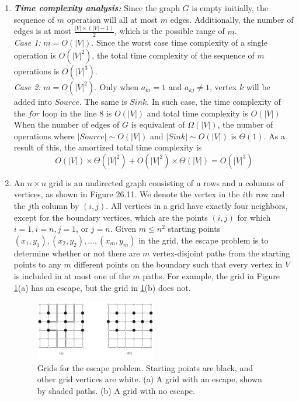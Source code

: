 \documentclass[12pt,a4paper]{article}
\makeatletter
\newtheorem*{solution}{Solution}
\theoremstyle{definition}
\renewenvironment{solution}[1][Solution] {\par\pushQED{\qed}\normalfont\topsep6\p@\@plus6\p@\relax\trivlist\item[\hskip\labelsep\bfseries#1\@addpunct{.}]\ignorespaces}{\popQED\endtrivlist\@endpefalse} \makeatother
\makeatother
\begin{document}
\begin{enumerate}
\begin{solution}
    \textbf{\textit{Time complexity analysis:}}
	Since the graph $G$ is empty initially, the sequence of $m$ operation will all at most $m$ edges. Additionally, the number of edges is at most $\frac{|V|\times (|V|-1)}{2}$, which is the possible range of $m$.
	\\
	\textit{Case 1:} $m=O(|V|)$. Since the worst case time complexity of a single operation is $O(|V|^2)$, the total time complexity of the sequence of $m$ operations is $O(|V|^3)$.\\
	\textit{Case 2:} $m=O(|V|^2)$. Only when $a_{ki}=1$ and $a_{kj}\neq 1$, vertex $k$ will be added into $Source$. The same is $Sink$. In such case, the time complexity of the $for$ loop in the line 8 is $O(|V|)$ and total time complexity is $O(|V|)$ \\
	When the number of edges of $G$ is equivalent of $\Omega(|V|)$, the number of operations where $|Source|\sim O(|V|)$ and $|Sink|\sim O(|V|)$ is $\Theta(1)$. 
	As a result of this, the amortized total time complexity is
	$$O(|V|)\times \Theta(|V|^2)+O(|V|^2)\times \Theta(|V|)=O(|V|^3)$$
	\end{solution}
	\item An $n\times n$ grid is an undirected graph consisting of n rows and n columns of vertices, as shown in Figure 26.11. We denote the vertex in the $i$th row and the $j$th column by $(i,j)$. All vertices in a grid have exactly four neighbors, except for the boundary vertices, which are the points $(i,j)$ for which $i = 1, i = n, j = 1$, or $j = n$.
    Given $m\leqslant n^2$ starting points $(x_1,y_1), (x_2, y_2), ... , (x_m, y_m)$ in the grid, the escape problem is to determine whether or not there are $m$ vertex-disjoint paths from the starting points to any $m$ different points on the boundary such that every vertex in $V$ is included in at most one of the $m$ paths. For example, the grid in Figure \ref{Fig-EscapeProblem}(a) has an escape, but the grid in \ref{Fig-EscapeProblem}(b) does not.
    \begin{figure}[!htbp]
	\centering
	\includegraphics[width=0.5\textwidth]{Fig-EscapeProblem.pdf}
	\caption{Grids for the escape problem. Starting points are black, and other grid vertices are white. (a) A grid with an escape, shown by shaded paths. (b) A grid with no escape.}
	\label{Fig-EscapeProblem}
	\end{figure}
	

\end{enumerate}
\end{document}
